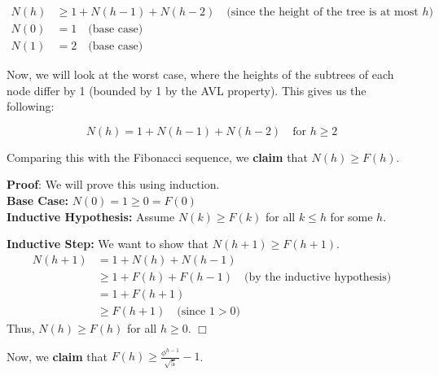 \documentclass[a4paper]{article}
\def\endproofmark{$\Box$}
\newenvironment{proof}{\par{\bf Proof}:}{\endproofmark\smallskip}
\begin{document}
\begin{align*}
    N(h) &\geq 1 + N(h-1) + N(h-2) \quad \text{(since the height of the tree is at most $h$)} \\
    N(0) &= 1 \quad \text{(base case)} \\
    N(1) &= 2 \quad \text{(base case)}
\end{align*}

\noindent Now, we will look at the worst case, where the heights of the subtrees of each node differ by 1 (bounded by 1 by the AVL property). This gives us the following:

\[
    N(h) = 1 + N(h-1) + N(h-2) \quad \text{for } h \geq 2
\]

\noindent Comparing this with the Fibonacci sequence, we \textbf{claim} that $N(h) \geq F(h)$. \\

\begin{proof}
    We will prove this using induction. \\

    \textbf{Base Case:} $N(0) = 1 \geq 0 = F(0)$ \\

    \textbf{Inductive Hypothesis:} Assume $N(k) \geq F(k)$ for all $k \leq h$ for some $h$.

    \textbf{Inductive Step:} We want to show that $N(h+1) \geq F(h+1)$.
    \begin{align*}
        N(h+1) &= 1 + N(h) + N(h-1) \\
        &\geq 1 + F(h) + F(h-1) \quad \text{(by the inductive hypothesis)} \\
        &= 1 + F(h+1) \\
        &\geq F(h+1) \quad \text{(since } 1 > 0 \text{)}
    \end{align*}
    Thus, $N(h) \geq F(h)$ for all $h \geq 0$.
\end{proof}

\vspace{0.5em}
\noindent Now, we \textbf{claim} that $F(h) \ge \frac{\phi^{h-1}}{\sqrt{5}} - 1$. \\
\end{document}
